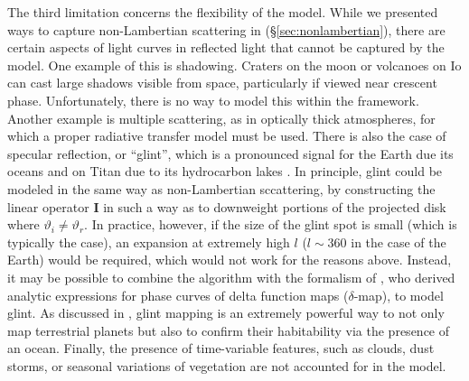 \documentclass[modern]{aastex62}
\begin{document}
The third limitation concerns the flexibility of the \starry model.
While we presented ways to capture non-Lambertian scattering
in \starry (\S\ref{sec:nonlambertian}), there are certain aspects
of light curves in reflected light that cannot be captured by the model.
One example of this is shadowing. Craters on the moon or
volcanoes on Io can cast large shadows visible from space, particularly
if viewed near crescent phase. Unfortunately, there is no way to model
this within the \starry framework. Another example is multiple scattering,
as in optically thick atmospheres, for which a proper radiative transfer model
must be used. There is also the case of specular reflection,
or ``glint'', which is a pronounced signal for the Earth due its
oceans \citep{Robinson2014} and on Titan due to
its hydrocarbon lakes \citep{Barnes2011}. In principle, glint could be
modeled in the same way as non-Lambertian sccattering, by constructing the
linear operator $\mathbf{I}$ in such a way as to downweight portions of the
projected disk where $\vartheta_i \neq \vartheta_r$. In practice, however,
if the size of the glint spot is small (which is typically the case),
an expansion at extremely high $l$ ($l \sim 360$ in the case of the Earth)
would be required, which would not work for the reasons above.
Instead, it may be possible to combine the \starry algorithm with the
formalism of \citet{Haggard2018}, who derived analytic expressions for
phase curves of delta function maps ($\delta$-map), to model glint.
As discussed in \citet{LustigYaeger2018}, glint mapping is an extremely
powerful way to not only map terrestrial planets but also to confirm
their habitability via the presence of an ocean.  Finally, the presence
of time-variable features, such as clouds, dust storms, or seasonal
variations of vegetation are not accounted for in the model.
\end{document}
